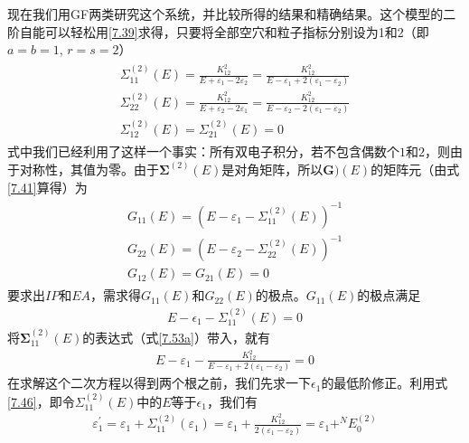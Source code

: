 现在我们用GF两类研究这个系统，并比较所得的结果和精确结果。这个模型的二阶自能可以轻松用\eqref{7.39}求得，只要将全部空穴和粒子指标分别设为1和2（即$a=b=1$, $r=s=2$）
\begin{subequations}
    \begin{align}\begin{array}{l}
    \Sigma_{11}^{(2)}(E)=\frac{K_{12}^{2}}{E+\varepsilon_{1}-2 \varepsilon_{2}}=\frac{K_{12}^{2}}{E-\varepsilon_{1}+2\left(\varepsilon_{1}-\varepsilon_{2}\right)} \label{7.53a}\\
    \Sigma_{22}^{(2)}(E)=\frac{K_{12}^{2}}{E+\varepsilon_{2}-2 \varepsilon_{1}}=\frac{K_{12}^{2}}{E-\varepsilon_{2}-2\left(\varepsilon_{1}-\varepsilon_{2}\right)} \\
    \Sigma_{12}^{(2)}(E)=\Sigma_{21}^{(2)}(E)=0
    \end{array}\end{align}
\end{subequations}
式中我们已经利用了这样一个事实：所有双电子积分，若不包含偶数个$1$和$2$，则由于对称性，其值为零。由于$\mathbf{\Sigma}^{(2)}(E)$是对角矩阵，所以$\mathbf{G})(E)$的矩阵元（由式\eqref{7.41}算得）为
\begin{subequations}
\begin{align}\begin{array}{l}
G_{11}(E)=\left(E-\varepsilon_{1}-\Sigma_{11}^{(2)}(E)\right)^{-1} \\
G_{22}(E)=\left(E-\varepsilon_{2}-\Sigma_{22}^{(2)}(E)\right)^{-1} \\
G_{12}(E)=G_{21}(E)=0
\end{array}\end{align}
\end{subequations}
要求出$IP$和$EA$，需求得$G_{11}(E)$和$G_{22}(E)$的极点。$G_{11}(E)$的极点满足
\begin{align}
E - \epsilon_1 - \Sigma_{11}^{(2)}(E) = 0
\end{align}
将$\mathbf{\Sigma}_{11}^{(2)}(E)$的表达式（式\eqref{7.53a}）带入，就有
\begin{align}
    E-\varepsilon_{1}-\frac{K_{12}^{2}}{E-\varepsilon_{1}+2\left(\varepsilon_{1}-\varepsilon_{2}\right)}=0
\end{align}
在求解这个二次方程以得到两个根之前，我们先求一下$\epsilon_1$的最低阶修正。利用式\eqref{7.46}，即令$\Sigma_{11}^{(2)}(E)$中的$E$等于$\epsilon_{1}$，我们有
\begin{align}
\varepsilon_{1}^{\prime}=\varepsilon_{1}+\Sigma_{11}^{(2)}\left(\varepsilon_{1}\right)=\varepsilon_{1}+\frac{K_{12}^{2}}{2\left(\varepsilon_{1}-\varepsilon_{2}\right)}=\varepsilon_{1}+ ^NE_{0}^{(2)}
\end{align}
